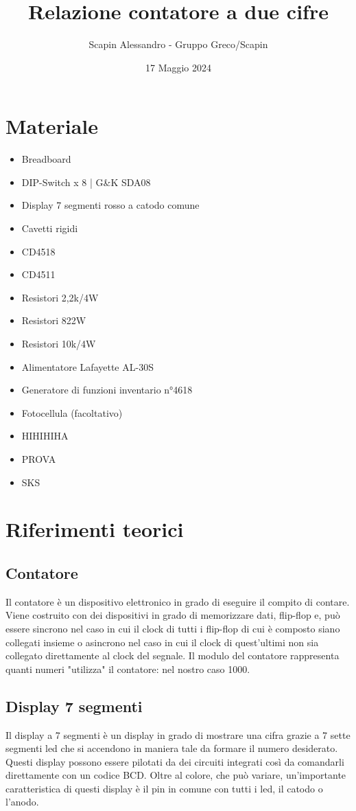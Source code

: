 \documentclass[a4paper, 10pt]{RelazioneLab}
\title{Relazione contatore a due cifre}
\author{Scapin Alessandro - Gruppo Greco/Scapin}
\date{17 Maggio 2024}
\begin{document}
\maketitle

\section{Materiale}
\begin{multicols}{2}
    \begin{itemize}
        \item Breadboard
        \item DIP-Switch x 8 | G\&K SDA08
        \item Display 7 segmenti rosso a catodo comune
        \item Cavetti rigidi
        \item CD4518
        \item CD4511
        \item Resistori 2,2k\ohm {}/4W
        \item Resistori 82\ohm \space 2W
        \item Resistori 10k\ohm {}/4W
        \item Alimentatore Lafayette AL-30S
        \item Generatore di funzioni inventario n°4618
        \item Fotocellula (facoltativo)
        \item HIHIHIHA
        \item PROVA
        \item SKS
    \end{itemize}
\end{multicols}
\section{Riferimenti teorici}
\subsection{Contatore}
Il contatore è un dispositivo elettronico in grado di eseguire il compito di contare. Viene costruito con dei dispositivi in grado di memorizzare dati, flip-flop e, può essere sincrono nel caso in cui il clock di tutti i flip-flop di cui è composto siano collegati insieme o asincrono nel caso in cui il clock di quest'ultimi non sia collegato direttamente al clock del segnale. Il modulo del contatore rappresenta quanti numeri "utilizza" il contatore: nel nostro caso 1000.
\subsection{Display 7 segmenti}
Il display a 7 segmenti è un display in grado di mostrare una cifra grazie a 7 sette segmenti led che si accendono in maniera tale da formare il numero desiderato. Questi display possono essere pilotati da dei circuiti integrati così da comandarli direttamente con un codice BCD. Oltre al colore, che può variare, un'importante caratteristica di questi display è il pin in comune con tutti i led, il catodo o l'anodo.
\end{document}
